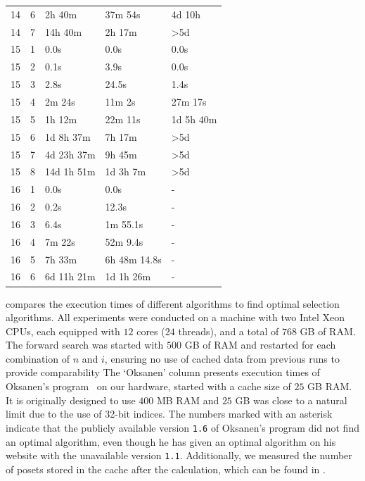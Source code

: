 \documentclass[twoside,leqno,twocolumn]{article}
\begin{document}
\begin{table}[!t]
\begin{tabular}{c|c|l|l|l}
    14  & 6   & 2h 40m           & 37m 54s           & 4d 10h           \\
    14  & 7   & 14h 40m          & 2h 17m            & >5d              \\
    \hline
    15  & 1   & 0.0s             & 0.0s              & 0.0s             \\
    15  & 2   & 0.1s             & 3.9s              & 0.0s             \\
    15  & 3   & 2.8s             & 24.5s             & 1.4s             \\
    15  & 4   & 2m 24s           & 11m 2s            & 27m 17s          \\
    15  & 5   & 1h 12m           & 22m 11s           & 1d 5h 40m        \\
    15  & 6   & 1d 8h 37m        & 7h 17m            & >5d              \\
    15  & 7   & 4d 23h 37m       & 9h 45m            & >5d              \\
    15  & 8   & 14d 1h 51m       & 1d 3h 7m          & >5d              \\
    \hline
    16  & 1   & 0.0s             & 0.0s              & -                \\
    16  & 2   & 0.2s             & 12.3s             & -                \\
    16  & 3   & 6.4s             & 1m 55.1s          & -                \\
    16  & 4   & 7m 22s           & 52m 9.4s          & -                \\
    16  & 5   & 7h 33m           & 6h 48m 14.8s      & -                \\
    16  & 6   & 6d 11h 21m       & 1d 1h 26m         & -                \\
  \end{tabular}
\end{table}

 compares the execution times of different algorithms to find optimal selection algorithms.
All experiments were conducted on a machine with two Intel Xeon CPUs, each equipped with $12$ cores ($24$ threads), and a total of $768$ GB of RAM. %
The forward search was started with $500$ GB of RAM and restarted for each combination of $n$ and $i$, ensuring no use of cached data from previous runs to provide comparability
The `Oksanen' column presents execution times of Oksanen's program~\cite{Oksanen} on our hardware, started with a cache size of $25$ GB RAM.
It is originally designed to use $400$ MB RAM and $25$ GB was close to a natural limit due to the use of 32-bit indices.
The numbers marked with an asterisk indicate that the publicly available version \texttt{1.6} of Oksanen's program did not find an optimal algorithm, even though he has given an optimal algorithm on his website with the unavailable version \texttt{1.1}.
Additionally, we measured the number of posets stored in the cache after the calculation, which can be found in .
\end{document}
